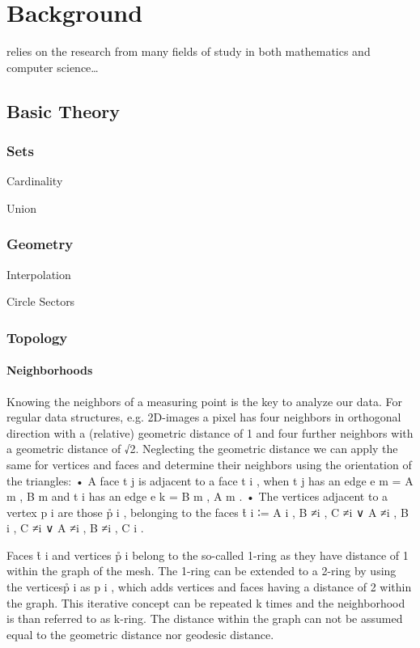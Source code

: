 \chapter{Background}
\label{ch2}
 relies on the research from many fields of study in both mathematics and computer science\ldots
{}
%
%
%
%
%
\section{Basic Theory}
\subsection{Sets}
Cardinality

Union
%
\subsection{Geometry}
Interpolation

Circle Sectors
%
\subsection{Topology}
%
\subsubsection{Neighborhoods}
Knowing the neighbors of a measuring point is the key to analyze our data. For regular data structures, e.g. 2D-images a pixel has four neighbors in orthogonal direction with a (relative) geometric distance of 1 and four further neighbors with a geometric distance of √2. Neglecting the geometric distance we can apply the same for vertices and faces and determine their neighbors using the orientation of the triangles:
• A face t j is adjacent to a face t i , when t j has an edge e m = {A m , B m }and t i has an edge e k = {B m , A m }.
• The vertices adjacent to a vertex p i are those p̊ i , belonging to the faces t̊ i ∶= {A i , B ≠i , C ≠i } ∨ {A ≠i , B i , C ≠i } ∨ {A ≠i , B ≠i , C i }.

Faces t̊ i and vertices p̊ i belong to the so-called 1-ring as they have distance of 1 within the graph of the mesh. The 1-ring can be extended to a 2-ring by using the verticesp̊ i as p i , which adds vertices and faces having a distance of 2 within the graph. This iterative concept can be repeated k times and the neighborhood is than referred to as k-ring. The distance within the graph can not be assumed equal to the geometric distance nor geodesic distance.

